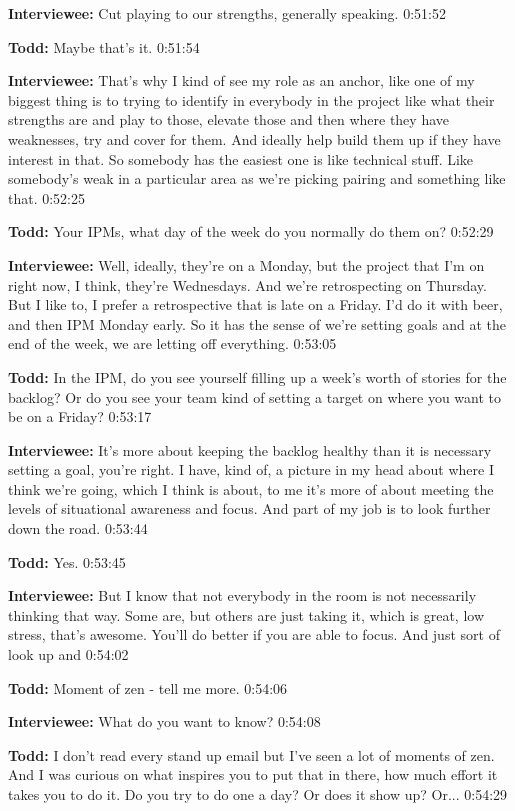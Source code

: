 \textbf{Interviewee:}  	Cut playing to our strengths, generally speaking.  0:51:52

\textbf{Todd:}  	Maybe that's it.  0:51:54

\textbf{Interviewee:}	That's why I kind of see my role as an anchor, like one of my biggest thing is to trying to identify in everybody in the project like what their strengths are and play to those, elevate those and then where they have weaknesses, try and cover for them.  And ideally  help build them up if they have interest in that.  So somebody has the easiest one is like technical stuff.  Like somebody's weak in a particular area as we're picking pairing and something like that.   0:52:25

\textbf{Todd:}  	Your IPMs, what day of the week do you normally do them on?  0:52:29

\textbf{Interviewee:}  	Well, ideally, they're on a Monday, but the project that I'm on right now, I think, they're Wednesdays.  And we're retrospecting on Thursday. But I like to, I prefer a retrospective that is late on a Friday.  I'd do it with beer, and then IPM Monday early.  So it has the sense of we're setting goals and at the end of the week, we are letting off everything.  0:53:05

\textbf{Todd:}  	In the IPM, do you see yourself filling up a week's worth of stories for the backlog?  Or do you see your team kind of setting a target on where you want to be on a Friday?  0:53:17

\textbf{Interviewee:}  	It's more about keeping the backlog healthy than it is necessary setting a goal, you're right.  I have, kind of, a picture in my head about where I think we're going, which I think is about, to me it's more of about meeting the levels of situational awareness and focus.  And part of my job is to look further down the road.  0:53:44

\textbf{Todd:}  	Yes.  0:53:45

\textbf{Interviewee:}  	But I know that not everybody in the room is not necessarily thinking that way.  Some are, but others are just taking it, which is great, low stress, that's awesome.  You'll do better if you are able to focus.  And just sort of look up and   0:54:02

\textbf{Todd:}	Moment of zen - tell me more.  0:54:06

\textbf{Interviewee:}  	What do you want to know?  0:54:08

\textbf{Todd:}  	I don't read every stand up email but I've seen a lot of moments of zen.  And I was curious on what inspires you to put that in there, how much effort it takes you to do it.  Do you try to do one a day?  Or does it show up?  Or...  0:54:29

